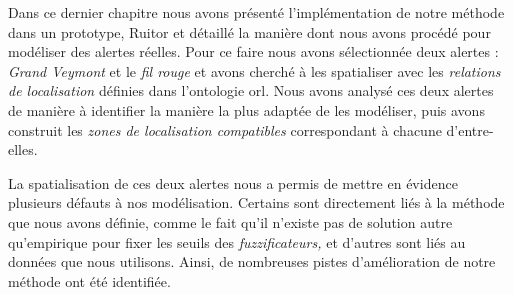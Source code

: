 Dans ce dernier chapitre nous avons présenté l'implémentation de notre
méthode dans un prototype, Ruitor et détaillé la manière dont nous
avons procédé pour modéliser des alertes réelles. Pour ce faire nous
avons sélectionnée deux alertes : \emph{Grand Veymont} et le \emph{fil
  rouge} et avons cherché à les spatialiser avec les \emph{relations
  de localisation} définies dans l'ontologie \ac{orl}. Nous avons
analysé ces deux alertes de manière à identifier la manière la plus
adaptée de les modéliser, puis avons construit les \emph{zones de
  localisation compatibles} correspondant à chacune d'entre-elles.

La spatialisation de ces deux alertes nous a permis de mettre en
évidence plusieurs défauts à nos modélisation. Certains sont
directement liés à la méthode que nous avons définie, comme le fait
qu'il n'existe pas de solution autre qu'empirique pour fixer les
seuils des \emph{fuzzificateurs,} et d'autres sont liés au données que
nous utilisons. Ainsi, de nombreuses pistes d'amélioration de notre
méthode ont été identifiée.
